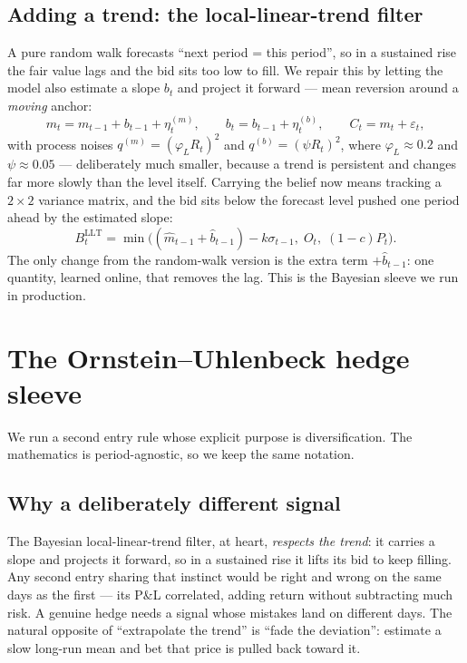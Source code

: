 \documentclass[11pt]{article}
\begin{document}
\subsection{Adding a trend: the local-linear-trend filter}
A pure random walk forecasts ``next period = this period'', so in a sustained rise the fair value
lags and the bid sits too low to fill. We repair this by letting the model also estimate a slope
$b_t$ and project it forward --- mean reversion around a \emph{moving} anchor:
\begin{equation}
m_t=m_{t-1}+b_{t-1}+\eta_t^{(m)},\qquad b_t=b_{t-1}+\eta_t^{(b)},\qquad C_t=m_t+\varepsilon_t,
\end{equation}
with process noises $q^{(m)}=(\varphi_L R_t)^2$ and $q^{(b)}=(\psi R_t)^2$, where
$\varphi_L\approx0.2$ and $\psi\approx0.05$ --- deliberately much smaller, because a trend is
persistent and changes far more slowly than the level itself. Carrying the belief now means
tracking a $2\times2$ variance matrix, and the bid sits below the forecast level pushed one
period ahead by the estimated slope:
\begin{equation}
B_t^{\text{LLT}}=\min\bigl((\hat m_{t-1}+\hat b_{t-1})-k\sigma_{t-1},\;O_t,\;(1-c)P_t\bigr).
\end{equation}
The only change from the random-walk version is the extra term $+\hat b_{t-1}$: one quantity,
learned online, that removes the lag. This is the Bayesian sleeve we run in production.

\section{The Ornstein--Uhlenbeck hedge sleeve}

We run a second entry rule whose explicit purpose is diversification. The mathematics is
period-agnostic, so we keep the same notation.

\subsection{Why a deliberately different signal}
The Bayesian local-linear-trend filter, at heart, \emph{respects the trend}: it carries a slope
and projects it forward, so in a sustained rise it lifts its bid to keep filling. Any second
entry sharing that instinct would be right and wrong on the same days as the first --- its P\&L
correlated, adding return without subtracting much risk. A genuine hedge needs a signal whose
mistakes land on different days. The natural opposite of ``extrapolate the trend'' is ``fade the
deviation'': estimate a slow long-run mean and bet that price is pulled back toward it.
\end{document}
